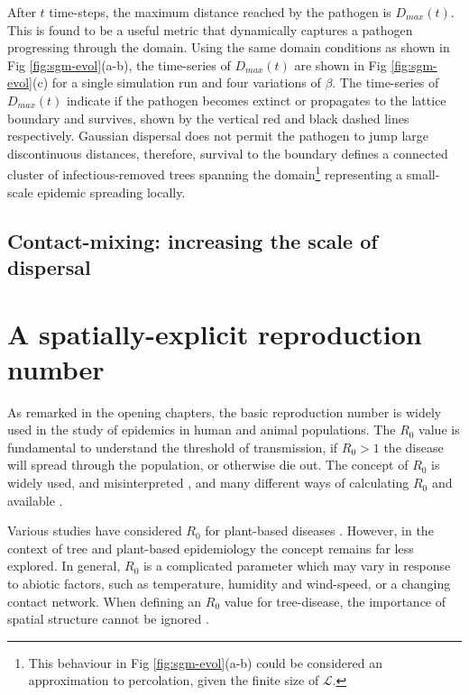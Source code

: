 After $t$ time-steps, the maximum distance reached by the pathogen is $D_{max}(t)$. This is found to be a useful metric that dynamically captures a pathogen progressing through the domain. Using the same domain conditions as shown in Fig \ref{fig:sgm-evol}(a-b), the time-series of $D_{max}(t)$ are shown in Fig \ref{fig:sgm-evol}(c) for a single simulation run and four variations of $\beta$. The time-series of $D_{max}(t)$ indicate if the pathogen becomes extinct or propagates to the lattice boundary and survives, shown by the vertical red and black dashed lines respectively. Gaussian dispersal does not permit the pathogen to jump large discontinuous distances, therefore, survival to the boundary defines a connected cluster of infectious-removed trees spanning the domain\footnote{This behaviour in Fig \ref{fig:sgm-evol}(a-b) could be considered an approximation to percolation, given the finite size of $\mathcal{L}$.} representing a small-scale epidemic spreading locally.\\




\subsection{Contact-mixing: increasing the scale of dispersal}


\blindtext %
\newpage



\section{A spatially-explicit reproduction number}

As remarked in the opening chapters, the basic reproduction number is widely used in the %
study of epidemics in human and animal populations. %
The $R_0$ value is fundamental to understand the threshold of transmission, if $R_0>1$ the %
disease will spread through the population, or otherwise die out. The concept of $R_0$ is %
widely used, and misinterpreted \cite{delamater2019complexity}, and many different ways of %
calculating $R_0$ and available \cite{perspectives-on-r0}.

Various studies have considered $R_0$ for plant-based diseases %
\cite{gubbins2000population, park2001invasion, doi:10.1146/annurev.phyto.011108.135838, van2011periodic, mikaberidze2016invasiveness}. %
However, in the context of tree and plant-based epidemiology the concept remains far less %
explored. In general, $R_0$ is a complicated parameter which may vary in response to abiotic %
factors, such as temperature, humidity and wind-speed, or a changing contact network. %
When defining an $R_0$ value for tree-disease, the importance of spatial structure cannot be %
ignored \cite{park2001invasion}.

